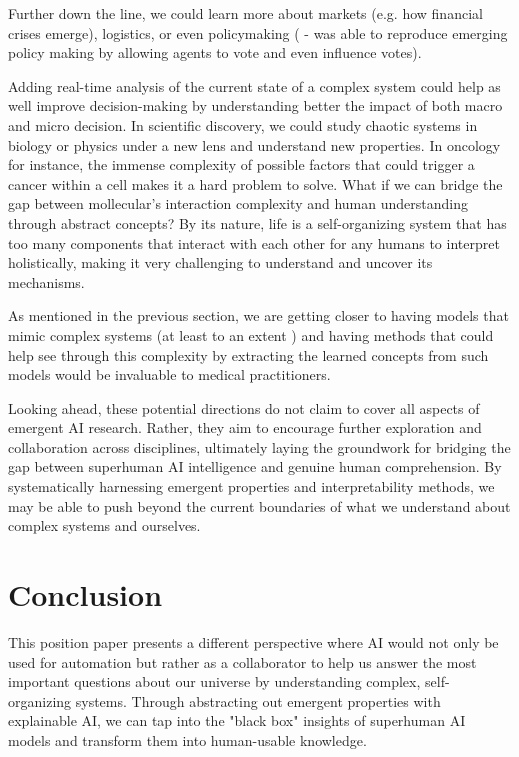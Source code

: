 \documentclass[11pt]{article}
\begin{document}
Further down the line, we could learn more about markets (e.g. how financial crises emerge), logistics, or even policymaking (\cite{altera} - was able to reproduce emerging policy making by allowing agents to vote and even influence votes).

Adding real-time analysis of the current state of a complex system could help as well improve decision-making by understanding better the impact of both macro and micro decision.
In scientific discovery, we could study chaotic systems in biology or physics under a new lens and understand new properties. In oncology for instance, the immense complexity of possible factors that could trigger a cancer within a cell makes it a hard problem to solve. What if we can bridge the gap between mollecular's interaction complexity and human understanding through abstract concepts? By its nature, life is a self-organizing system that has too many components that interact with each other for any humans to interpret holistically, making it very challenging to understand and uncover its mechanisms.

As mentioned in the previous section, we are getting closer to having models that mimic complex systems (at least to an extent \cite{alphafold}) and having methods that could help see through this complexity by extracting the learned concepts from such models would be invaluable to medical practitioners.

Looking ahead, these potential directions do not claim to cover all aspects of emergent AI research. Rather, they aim to encourage further exploration and collaboration across disciplines, ultimately laying the groundwork for bridging the gap between superhuman AI intelligence and genuine human comprehension. By systematically harnessing emergent properties and interpretability methods, we may be able to push beyond the current boundaries of what we understand about complex systems and ourselves.

\section{Conclusion}
This position paper presents a different perspective where AI would not only be used for automation but rather as a collaborator to help us answer the most important questions about our universe by understanding complex, self-organizing systems. Through abstracting out emergent properties with explainable AI, we can tap into the "black box" insights of superhuman AI models and transform them into human-usable knowledge.
\end{document}
